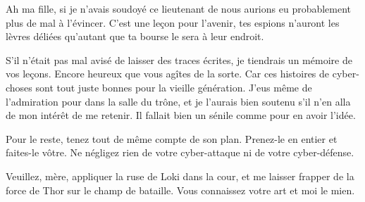 \scene

\StageDirII{\reine, \princesse}

\begin{drama}
  \reinespeaks Ah ma fille, si je n’avais soudoyé ce lieutenant de \general{} nous aurions eu probablement plus de mal à l’évincer. C’est une leçon pour l’avenir, 
  tes espions n’auront les lèvres déliées qu’autant que ta bourse le sera à leur endroit.

  \princessespeaks S’il n’était pas mal avisé de laisser des traces écrites, je tiendrais un mémoire de vos leçons. Encore heureux que vous agîtes de la sorte. Car ces histoires de cyber-choses sont tout juste bonnes pour la vieille génération. J’eus même de l’admiration pour  \elena{} dans la salle du trône, et je l’aurais bien soutenu s’il n’en alla de mon intérêt de me retenir. Il fallait bien un sénile comme \general{} pour en avoir l’idée.

  \reinespeaks Pour le reste, tenez tout de même compte de son plan. Prenez-le en entier et faites-le vôtre. Ne négligez rien de votre cyber-attaque ni de votre cyber-défense.

  \princessespeaks Veuillez, mère, appliquer la ruse de Loki dans la cour, et me laisser frapper de la force de Thor sur le champ de bataille. Vous connaissez votre art et moi le mien.
\end{drama}

\scene

\StageDirII{\elena, \alexas}



